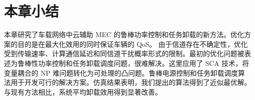 \section{本章小结}\label{section3-5}
本章研究了车载网络中云辅助 MEC 的鲁棒功率控制和任务卸载的新方法。优化方案的目的是在最大化效用的同时保证车辆的 QoS。 由于信道存在不确定性，优化受到传输速率、计算通信延迟和同信道干扰概率形式的限制。最初的优化问题被表述为鲁棒性功率控制和任务卸载调度问题，很难解决。这里应用了 SCA 技术，将变量耦合的 NP 难问题转化为可处理的凸问题。鲁棒电源控制和任务卸载调度算法用于开发可行的解决方案。仿真结果表明，我们提出的算法得到了近似最优解。与现有方法相比，系统平均卸载效用得到显著改善。

%
